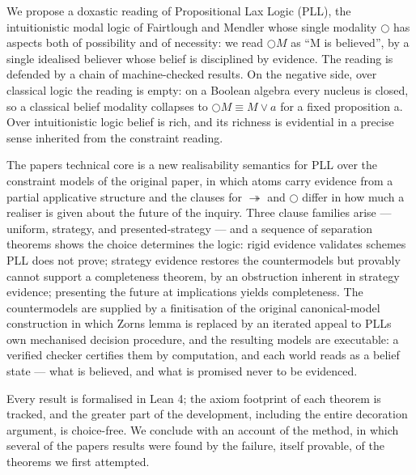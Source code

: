 We propose a doxastic reading of Propositional Lax Logic (PLL), the
intuitionistic modal logic of Fairtlough and Mendler whose single
modality \ensuremath{\bigcirc} has aspects both of possibility and of necessity: we read
\ensuremath{\bigcirc M} as ``M is believed'', by a single idealised believer whose belief is
disciplined by evidence. The reading is defended by a chain of
machine-checked results. On the negative side, over classical logic the
reading is empty: on a Boolean algebra every nucleus is closed, so a
classical belief modality collapses to \ensuremath{\bigcirc M \equiv M \vee a} for a fixed
proposition a. Over intuitionistic logic belief is rich, and its
richness is evidential in a precise sense inherited from the constraint
reading.

The paper\textquotesingle s technical core is a new realisability semantics for PLL
over the constraint models of the original paper, in which atoms carry
evidence from a partial applicative structure and the clauses for \ensuremath{\twoheadrightarrow} and
\ensuremath{\bigcirc} differ in how much a realiser is given about the future of the
inquiry. Three clause families arise --- uniform, strategy, and
presented-strategy --- and a sequence of separation theorems shows the
choice determines the logic: rigid evidence validates schemes PLL does
not prove; strategy evidence restores the countermodels but provably
cannot support a completeness theorem, by an obstruction inherent in
strategy evidence; presenting the future at implications yields
completeness. The countermodels are supplied by a finitisation of the
original canonical-model construction in which Zorn\textquotesingle s lemma is replaced
by an iterated appeal to PLL\textquotesingle s own mechanised decision procedure, and
the resulting models are executable: a verified checker certifies them
by computation, and each world reads as a belief state --- what is
believed, and what is promised never to be evidenced.

Every result is formalised in Lean 4; the axiom footprint of each
theorem is tracked, and the greater part of the development, including
the entire decoration argument, is choice-free. We conclude with an
account of the method, in which several of the paper\textquotesingle s results were
found by the failure, itself provable, of the theorems we first
attempted.
